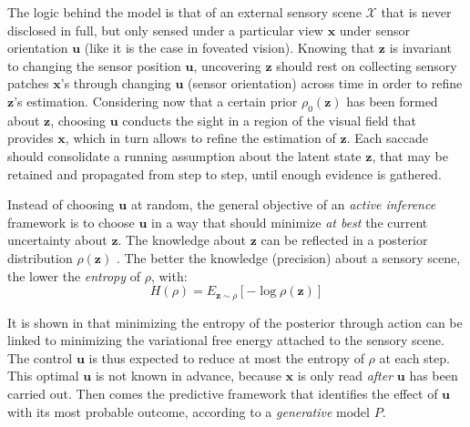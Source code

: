 \documentclass{article} %
\begin{document}
The logic behind the model is that of an external sensory scene $\mathcal{X}$ that is never disclosed in full, but only sensed under a particular view $\boldsymbol{x}$ under sensor orientation $\boldsymbol{u}$ (like it is the case in foveated vision). 
Knowing that $\boldsymbol{z}$ is invariant to changing the sensor position $\boldsymbol{u}$, uncovering $\boldsymbol{z}$ should rest on
collecting sensory patches $\boldsymbol{x}$'s through changing $\boldsymbol{u}$ (sensor orientation) across time in order to refine $\boldsymbol{z}$'s estimation. 
Considering now that a certain prior $\rho_0
(\boldsymbol{z})$ has been formed about $\boldsymbol{z}$, choosing  $\boldsymbol{u}$ conducts the sight in a region of the visual field that provides $\boldsymbol{x}$, which in turn allows to refine the estimation of $\boldsymbol{z}$.
Each saccade should consolidate a running assumption about the latent state $\boldsymbol{z}$, that may be retained and propagated from step to step, until enough evidence is gathered.

Instead of choosing $\boldsymbol{u}$ at random, the general objective of an \emph{active inference} framework is to choose $\boldsymbol{u}$ in a way that should minimize \emph{at best} the current uncertainty about $\boldsymbol{z}$. 
The knowledge about $\boldsymbol{z}$ can be reflected in a posterior distribution $\rho(\boldsymbol{z})$ . The better the knowledge (precision) about a sensory scene, the lower the \emph{entropy} of $\rho$, with:
\begin{equation}
H(\rho) = E_{\boldsymbol{z}\sim \rho}[- \log \rho(\boldsymbol{z})]\label{eq:entropy}
\end{equation}

It is shown in \cite{friston2012perceptions} that minimizing the entropy of the posterior through action can be linked to minimizing the variational free energy attached to the sensory scene. 
The control $\boldsymbol{u}$ is thus expected to reduce at most the entropy of $\rho$ at each step. This optimal $\boldsymbol{u}$ is not known in advance, because $\boldsymbol{x}$ is only read \emph{after} $\boldsymbol{u}$ has been carried out. Then comes the predictive framework that identifies the effect of $\boldsymbol{u}$ with its most probable outcome, according to a \emph{generative} model $P$.
	
\end{document}
